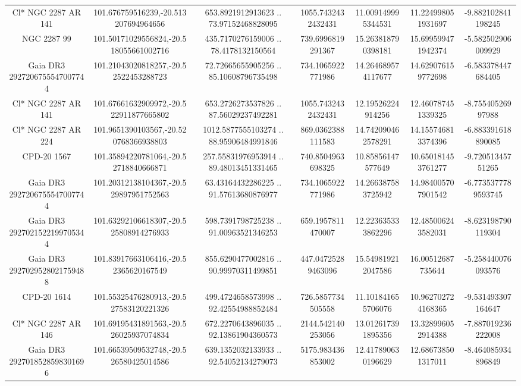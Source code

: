 \begin{table}
\begin{tabular}{ccccccc}
Cl* NGC 2287     AR     141 & 101.676759516239,-20.513207694964656 & 653.8921912913623 .. 73.97152468828095 & 1055.7432432432431 & 11.009149995344531 & 11.224998051931697 & -9.882102841198245 \\
NGC  2287    99 & 101.50171029556824,-20.518055661002716 & 435.7170276159006 .. 78.4178132150564 & 739.6996819291367 & 15.263818790398181 & 15.699599471942374 & -5.582502906009929 \\
Gaia DR3 2927206755547007744 & 101.21043020818257,-20.52522453288723 & 72.72665655905256 .. 85.10608796735498 & 734.1065922771986 & 14.264689574117677 & 14.629076159772698 & -6.583378447684405 \\
Cl* NGC 2287     AR     141 & 101.67661632909972,-20.522911877665802 & 653.2726273537826 .. 87.56029237492281 & 1055.7432432432431 & 12.19526224914256 & 12.460787451339325 & -8.75540526997988 \\
Cl* NGC 2287     AR     224 & 101.9651390103567,-20.520768366938803 & 1012.5877555103274 .. 88.95906484991846 & 869.0362388111583 & 14.742090462578291 & 14.155746813374396 & -6.883391618890085 \\
CPD-20  1567 & 101.35894220781064,-20.52718840666871 & 257.55831976953914 .. 89.48013451331465 & 740.8504963698325 & 10.85856147577649 & 10.650181453761277 & -9.72051345751265 \\
Gaia DR3 2927206755547007744 & 101.20312138104367,-20.529897951752563 & 63.43164432286225 .. 91.57613680876977 & 734.1065922771986 & 14.266387583725942 & 14.984005707901542 & -6.7735377789593745 \\
Gaia DR3 2927021522199705344 & 101.63292106618307,-20.525808914276933 & 598.7391798725238 .. 91.00963521346253 & 659.1957811470007 & 12.223635333862296 & 12.485006243582031 & -8.623198790119304 \\
Gaia DR3 2927029528021759488 & 101.83917663106416,-20.52365620167549 & 855.6290477002816 .. 90.99970311499851 & 447.04725289463096 & 15.549819212047586 & 16.00512687735644 & -5.258440076093576 \\
CPD-20  1614 & 101.55325476280913,-20.527583120221326 & 499.4724658573998 .. 92.42554988852484 & 726.5857734505558 & 11.101841655706076 & 10.962702724168365 & -9.531493307164647 \\
Cl* NGC 2287     AR     146 & 101.69195431891563,-20.526025937074834 & 672.2270643896035 .. 92.13861904360573 & 2144.542140253056 & 13.012617391895356 & 13.328996052914388 & -7.887019236222008 \\
Gaia DR3 2927018528598301696 & 101.66539509532748,-20.526580425014586 & 639.1352032133933 .. 92.54052134279073 & 5175.983436853002 & 12.417890630196629 & 12.686738501317011 & -8.464085934896849 \\

\end{tabular}
\end{table}
